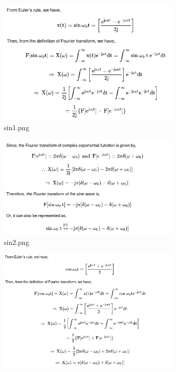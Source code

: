 \documentclass[12pt]{exam}
\begin{document}
\begin{enumerate}
    \begin{figure}[H]
      \centering
      \includegraphics[width=0.8\textwidth]{sin1.png}
      \caption{sin1.png}
      \label{fig:sin1-png}
    \end{figure}
    \begin{figure}[H]
      \centering
      \includegraphics[width=0.8\textwidth]{sin2.png}
      \caption{sin2.png}
      \label{fig:sin2-png}
    \end{figure}
    \begin{figure}[H]
      \centering
      \includegraphics[width=0.8\textwidth]{cos1.png}

\end{figure}
\end{enumerate}
\end{document}
